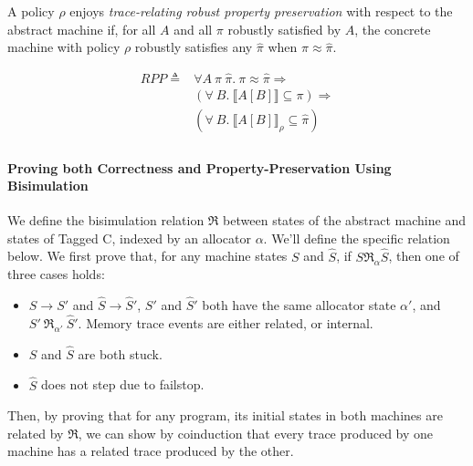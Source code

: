 \documentclass{article}
\begin{document}
A policy \(\rho\) enjoys {\em trace-relating robust property preservation} with respect to the
abstract machine if, for all \(A\) and all \(\pi\) robustly satisfied by \(A\), the concrete
machine with policy \(\rho\) robustly satisfies any \(\hat{\pi}\) when \(\pi \approx \hat{\pi}\).

\[\begin{split}
\mathit{RPP} \triangleq & \forall A ~ \pi ~ \hat{\pi} . ~ \pi \approx \hat{\pi} \Rightarrow \\
& (\forall ~ B . ~ \llbracket A[B] \rrbracket \subseteq \pi) \Rightarrow \\
& (\forall ~ B . ~ \llbracket A[B] \rrbracket_\rho \subseteq \hat{\pi}) \\
\end{split}\]

\paragraph{Proving both Correctness and Property-Preservation Using Bisimulation}

We define the bisimulation relation \(\mathfrak{R}\) between states of the abstract machine and
states of Tagged C, indexed by an allocator \(\alpha\). We'll define the specific relation
below. We first prove that, for any machine states \(S\) and
\(\hat{S}\), if \(S \mathfrak{R}_\alpha \hat{S}\), then one of three cases holds:
\begin{itemize}
\item \(S \longrightarrow S'\) and \(\hat{S} \longrightarrow \hat{S}'\), \(S'\) and \(\hat{S}'\)
  both have the same allocator state \(\alpha'\), and \(S' ~ \mathfrak{R}_{\alpha'} ~ \hat{S}'\).
  Memory trace events are either related, or internal.
\item \(S\) and \(\hat{S}\) are both stuck.
\item \(\hat{S}\) does not step due to failstop.
\end{itemize}

Then, by proving that for any program, its initial states in both machines are related
by \(\mathfrak{R}\), we can show by coinduction that every trace produced by one machine
has a related trace produced by the other.
\end{document}
